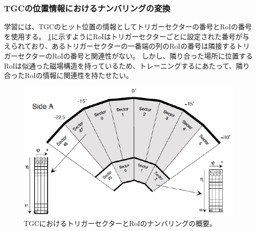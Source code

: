 

\subsubsection{TGCの位置情報におけるナンバリングの変換}
学習には、TGCのヒット位置の情報としてトリガーセクターの番号とRoIの番号を使用する。
\ref{fig:TGCnumbering}に示すようにRoIはトリガーセクターごとに設定された番号が与えられており、あるトリガーセクターの一番端の列のRoIの番号は隣接するトリガーセクターのRoIの番号と関連性がない。
しかし、隣り合った場所に位置するRoIは似通った磁場構造を持っているため、トレーニングするにあたって、隣り合ったRoIの情報に関連性を持たせたい。

\begin{figure}[tb]
  \centering
  \includegraphics[clip, width=12cm]{fig/4/TGC_numbering.pdf}
  \caption{TGCにおけるトリガーセクターとRoIのナンバリングの概要。}
  \label{fig:TGCnumbering}
\end{figure}

